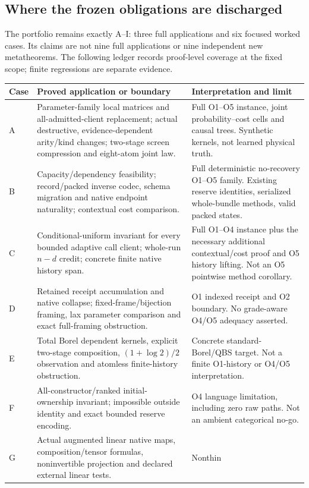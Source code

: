 \documentclass[11pt,a4paper]{article}
\theoremstyle{definition}
\begin{document}
\subsection{Where the frozen obligations are discharged}
The portfolio remains exactly A--I: three full applications and six
focused worked cases. Its claims are not nine full applications or nine
independent new metatheorems. The following ledger records proof-level
coverage at the fixed scope; finite regressions are separate evidence.
\begin{longtable}{@{}p{.08\linewidth}p{.45\linewidth}p{.37\linewidth}@{}}
\toprule Case&Proved application or boundary&Interpretation and limit\\\midrule\endhead
A&Parameter-family local matrices and all-admitted-client replacement;
actual destructive, evidence-dependent arity/kind changes; two-stage
screen compression and eight-atom joint law.&Full O1--O5 instance, joint
probability--cost cells and causal trees. Synthetic kernels, not learned
physical truth.\\
B&Capacity/dependency feasibility; record/packed inverse codec, schema
migration and native endpoint naturality; contextual cost comparison.&Full
deterministic no-recovery O1--O5 family. Existing reserve identities,
serialized whole-bundle methods, valid packed states.\\
C&Conditional-uniform invariant for every bounded adaptive call client;
whole-run $n-d$ credit; concrete finite native history span.&Full O1--O4
instance plus the necessary additional contextual/cost proof and O5
history lifting. Not an O5 pointwise method corollary.\\
D&Retained receipt accumulation and native collapse; fixed-frame/bijection
framing, lax parameter comparison and exact full-framing obstruction.&O1
indexed receipt and O2 boundary. No grade-aware O4/O5 adequacy asserted.\\
E&Total Borel dependent kernels, explicit two-stage composition,
$(1+\log2)/2$ observation and atomless finite-history obstruction.&Concrete
standard-Borel/QBS target. Not a finite O1-history or O4/O5 interpretation.\\
F&All-constructor/ranked initial-ownership invariant; impossible outside
identity and exact bounded reserve encoding.&O4 language limitation,
including zero raw paths. Not an ambient categorical no-go.\\
G&Actual augmented linear native maps, composition/tensor formulas,
noninvertible projection and declared external linear tests.&Nonthin

\end{longtable}
\end{document}
